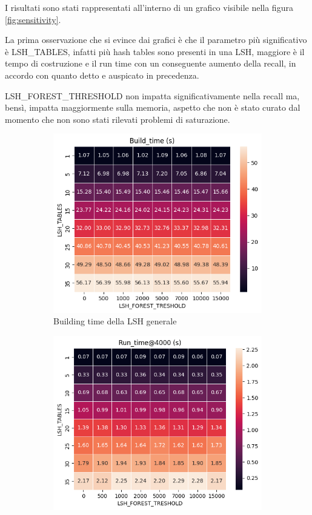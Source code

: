 I risultati sono stati rappresentati all'interno di un grafico visibile nella figura 
\ref{fig:sensitivity}.

La prima osservazione che si evince dai grafici è che il parametro più significativo è LSH\_TABLES,
infatti più hash tables sono presenti in una LSH, maggiore è il tempo di costruzione 
e il run time con un conseguente aumento della recall, in accordo con quanto detto
e auspicato in precedenza.

LSH\_FOREST\_THRESHOLD non impatta significativamente nella recall 
ma, bensì, impatta maggiormente sulla memoria, aspetto che non è stato curato dal 
momento che non sono stati rilevati problemi di saturazione.

\begin{figure}[!h]
    \centering
    \begin{subfigure}{.5\textwidth}
      \centering
      \includegraphics[width=.8\linewidth]{img/build_time.png}
      \caption{Building time della LSH generale}
      \label{fig:build_time}
    \end{subfigure}%
    \begin{subfigure}{.5\textwidth}
      \centering
      \includegraphics[width=.8\linewidth]{img/run_time.png}

\end{subfigure}
\end{figure}
